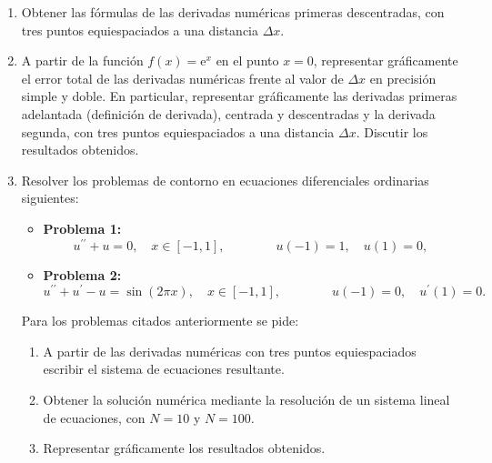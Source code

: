    \begin{enumerate}   
    
    \item Obtener las fórmulas de las derivadas numéricas primeras descentradas, con tres puntos
    equiespaciados a una distancia $\Delta x $.
    
    \item A partir de la función $f(x) = \mbox{e}^{x}$ en el punto $x=0$, 
    representar gráficamente el error total de las derivadas numéricas 
    frente al valor de $\Delta x$ en precisión simple y doble.
    En particular, representar gráficamente las derivadas primeras adelantada (definición de derivada), centrada y descentradas y la derivada segunda,
    con tres puntos equiespaciados a una distancia $\Delta x $. 
    Discutir los resultados obtenidos.
    
    
    
    \item Resolver los problemas de contorno en ecuaciones diferenciales ordinarias siguientes:
    
    \begin{itemize}
        
        \item {\bf Problema 1:}          
        $$
        u^{\prime\prime} + u = 0,\quad
        x\in[-1,1], \qquad \qquad u(-1)=1,\quad u(1)=0,
        $$
        
        \item {\bf Problema 2:}     
        $$
        u^{\prime\prime} + u^{\prime} - u=\sin(2 \pi x),\quad
        x\in[-1,1], \qquad \qquad u(-1)=0,\quad u^{\prime}(1)=0.
        $$
    \end{itemize}
    
    
    Para los problemas citados anteriormente se pide: 
    
    \begin{enumerate}
        \item A partir de las derivadas numéricas con tres puntos equiespaciados escribir el sistema de
        ecuaciones resultante.
        
        \item Obtener la solución numérica mediante la resolución de un sistema lineal de
        ecuaciones, con $N = 10$ y $N = 100$. 
        
        \item Representar gráficamente los resultados obtenidos.
    \end{enumerate}
    
   \end{enumerate}
   
